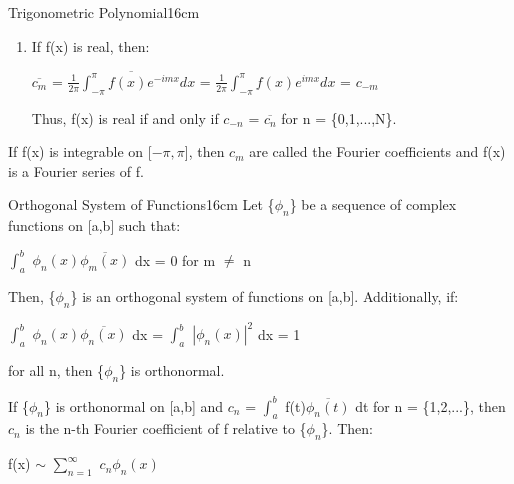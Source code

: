 \begin{definition}{Trigonometric Polynomial}{16cm}
\begin{enumerate}[label=(\alph*), leftmargin=1.5cm, itemsep=0.1cm]
                \hspace{4.2cm}
                = $\sum_{n=-N}^N$ [$\frac{1}{2\pi}$ $\int_{-\pi}^{\pi}$
                    $c_n e^{inx}e^{-imx}$ dx]
                = $c_m$

            \item If f(x) is real, then:
                
                \hspace{0.5cm}
                $\overline{c_m}$
                = $\overline{\frac{1}{2\pi} \int_{-\pi}^{\pi} f(x)e^{-imx} dx}$
                = $\frac{1}{2\pi} \int_{-\pi}^{\pi} f(x)e^{imx} dx$
                = $c_{-m}$

                Thus, f(x) is real if and only if $c_{-n}$ = $\overline{c_n}$
                for n = \{0,1,...,N\}.
        \end{enumerate}

        If f(x) is integrable on [$-\pi,\pi$], then $c_m$ are called the
        Fourier coefficients and f(x) is a {\color{lblue} Fourier series} of f.
    \end{definition}

    \vspace{0.5cm}



    \begin{definition}{Orthogonal System of Functions}{16cm}
        Let \{$\phi_n$\} be a sequence of complex functions on [a,b] such that:

        \hspace{0.5cm}
        $\int_a^b$ $\phi_n(x) \overline{\phi_m(x)}$ dx = 0
        \hspace{1cm}
        for m $\not =$ n

        Then, \{$\phi_n$\} is an {\color{lblue} orthogonal system of functions}
        on [a,b]. Additionally, if:
        
        \hspace{0.5cm}
        $\int_a^b$ $\phi_n(x) \overline{\phi_n(x)}$ dx
        = $\int_a^b$ $|\phi_n(x)|^2$ dx = 1
        
        for all n, then \{$\phi_n$\} is {\color{lblue} orthonormal}.

        \vspace{0.2cm}

        If \{$\phi_n$\} is orthonormal on [a,b] and
        $c_n$ = $\int_a^b$ f(t)$\overline{\phi_n(t)}$ dt for n = \{1,2,...\},
        then $c_n$ is the n-th Fourier coefficient of f relative to \{$\phi_n$\}.
        Then:

        \hspace{0.5cm}
        f(x) $\sim$ $\sum_{n=1}^{\infty}$ $c_n\phi_n(x)$
    \end{definition}

